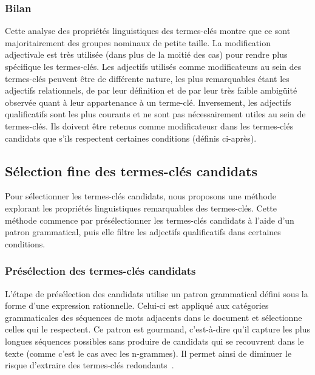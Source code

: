       \subsubsection{Bilan}
      \label{subsubsec:main:domain_independent_keyphrase_extraction-keyphrase_candidate_selection-analysis_of_keyphrase_properties-conclusion}
        Cette analyse des propriétés linguistiques des termes-clés montre que ce
        sont majoritairement des groupes nominaux de petite taille.
        La modification adjectivale est très utilisée (dans plus de la moitié
        des cas) pour rendre plus spécifique les termes-clés. Les adjectifs
        utilisés comme modificateurs au sein des termes-clés peuvent être de
        différente nature, les plus remarquables étant les adjectifs
        relationnels, de par leur définition et de par leur très faible
        ambigüité observée quant à leur appartenance à un terme-clé.
        Inversement, les adjectifs qualificatifs sont les plus courants et ne
        sont pas nécessairement utiles au sein de termes-clés. Ils doivent être
        retenus comme modificateusr dans les termes-clés candidats que s'ils
        respectent certaines conditions (définis ci-après).

    \subsection{Sélection fine des termes-clés candidats}
    \label{subsec:main:domain_independent_keyphrase_extraction-keyphrase_candidate_selection-modifiers_filtering}
      Pour sélectionner les termes-clés candidats, nous proposons une méthode
      explorant les propriétés linguistiques remarquables des termes-clés. Cette
      méthode commence par présélectionner les termes-clés candidats à l'aide
      d'un patron grammatical, puis elle filtre les adjectifs qualificatifs dans
      certaines conditions.

      \subsubsection{Présélection des termes-clés candidats}
      \label{subsubsec:main:domain_independent_keyphrase_extraction-keyphrase_candidate_selection-modifiers_filtering-candidate_pre_selection}
        L'étape de présélection des candidats utilise un patron grammatical
        défini sous la forme d'une expression rationnelle. Celui-ci est appliqué
        aux catégories grammaticales des séquences de mots adjacents dans le
        document et sélectionne celles qui le respectent. Ce patron est
        gourmand, c'est-à-dire qu'il capture les plus longues séquences
        possibles sans produire de candidats qui se recouvrent dans le texte
        (comme c'est le cas avec les n-grammes). Il permet ainsi de diminuer le
        risque d'extraire des termes-clés
        redondants~\cite{hasan2014state_of_the_art}.

